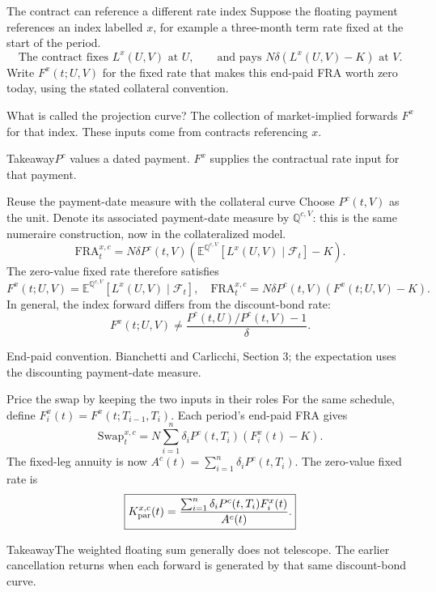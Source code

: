 \documentclass[handout,10pt,t,aspectratio=169]{beamer}
\newenvironment{keybox}{\begin{exampleblock}{Takeaway}}{\end{exampleblock}}
\newcommand{\E}{\mathbb E}
\newcommand{\Q}{\mathbb Q}
\newcommand{\F}{\mathcal F}
\newcommand{\source}[1]{\vfill{\scriptsize\color{gray}#1\par}}
\begin{document}
\begin{frame}{The contract can reference a different rate index}
Suppose the floating payment references an index labelled \(x\),
for example a three-month term rate fixed at the start of the period.
\[
 \text{The contract fixes }L^x(U,V)\text{ at }U,
 \qquad\text{and pays }N\delta(L^x(U,V)-K)\text{ at }V.
\]
Write \(F^x(t;U,V)\) for the fixed rate that makes this end-paid FRA worth zero today,
using the stated collateral convention.
\begin{block}{What is called the projection curve?}
The collection of market-implied forwards \(F^x\) for that index.
These inputs come from contracts referencing \(x\).
\end{block}
\begin{keybox}\(P^c\) values a dated payment.
\(F^x\) supplies the contractual rate input for that payment.\end{keybox}
\end{frame}

\begin{frame}{Reuse the payment-date measure with the collateral curve}
\small
Choose \(P^c(t,V)\) as the unit. Denote its associated payment-date measure
by \(\Q^{c,V}\): this is the same numeraire construction, now in the collateralized model.
\[
 \mathrm{FRA}^{x,c}_t=N\delta P^c(t,V)
 \left(\E^{\Q^{c,V}}[L^x(U,V)\mid\F_t]-K\right).
\]
The zero-value fixed rate therefore satisfies
\[
 \boxed{F^x(t;U,V)=\E^{\Q^{c,V}}[L^x(U,V)\mid\F_t],
 \quad \mathrm{FRA}^{x,c}_t=N\delta P^c(t,V)(F^x(t;U,V)-K).}
\]
In general, the index forward differs from the discount-bond rate:
\[
 F^x(t;U,V)\ne\frac{P^c(t,U)/P^c(t,V)-1}{\delta}.
\]
\source{End-paid convention. Bianchetti and Carlicchi, Section 3; the expectation uses the discounting payment-date measure.}
\end{frame}

\begin{frame}{Price the swap by keeping the two inputs in their roles}
\small
For the same schedule, define \(F_i^x(t)=F^x(t;T_{i-1},T_i)\).
Each period's end-paid FRA gives
\[
 \mathrm{Swap}^{x,c}_t=N\sum_{i=1}^n\delta_iP^c(t,T_i)(F_i^x(t)-K).
\]
The fixed-leg annuity is now \(A^c(t)=\sum_{i=1}^n\delta_iP^c(t,T_i)\).
The zero-value fixed rate is
\[
 \boxed{K_{\rm par}^{x,c}(t)=
 \frac{\sum_{i=1}^n\delta_iP^c(t,T_i)F_i^x(t)}{A^c(t)}.}
\]
\begin{keybox}The weighted floating sum generally does not telescope.
The earlier cancellation returns when each forward is generated by that same discount-bond curve.\end{keybox}
\end{frame}
\end{document}
